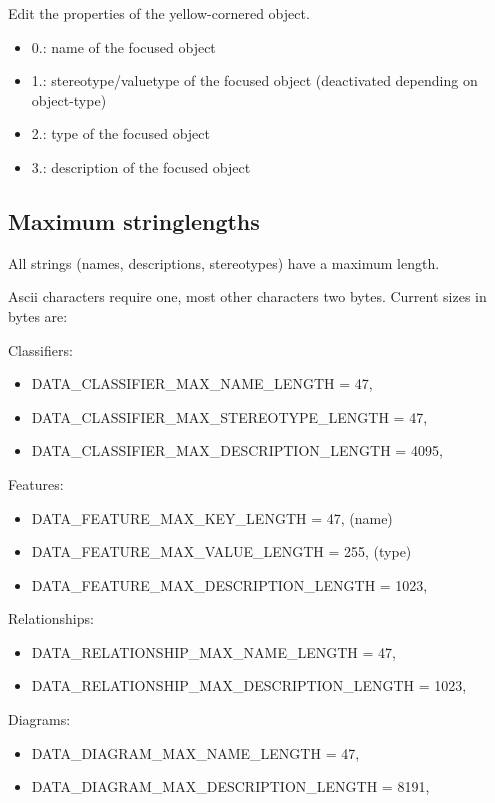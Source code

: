 Edit the properties of the yellow-cornered object.

\begin{itemize}
\item 0.: name of the focused object
\item 1.: stereotype/valuetype of the focused object (deactivated depending on object-type)
\item 2.: type of the focused object
\item 3.: description of the focused object
\end{itemize}

\subsection{Maximum stringlengths}

All strings (names, descriptions, stereotypes) have a maximum length.

Ascii characters require one, most other characters two bytes.
Current sizes in bytes are:

Classifiers:
\begin{itemize}
\item DATA\_CLASSIFIER\_MAX\_NAME\_LENGTH = 47,
\item DATA\_CLASSIFIER\_MAX\_STEREOTYPE\_LENGTH = 47,
\item DATA\_CLASSIFIER\_MAX\_DESCRIPTION\_LENGTH = 4095,
\end{itemize}

Features:
\begin{itemize}
\item DATA\_FEATURE\_MAX\_KEY\_LENGTH = 47,  (name)
\item DATA\_FEATURE\_MAX\_VALUE\_LENGTH = 255,  (type)
\item DATA\_FEATURE\_MAX\_DESCRIPTION\_LENGTH = 1023,
\end{itemize}

Relationships:
\begin{itemize}
\item DATA\_RELATIONSHIP\_MAX\_NAME\_LENGTH = 47,
\item DATA\_RELATIONSHIP\_MAX\_DESCRIPTION\_LENGTH = 1023,
\end{itemize}

Diagrams:
\begin{itemize}
\item DATA\_DIAGRAM\_MAX\_NAME\_LENGTH = 47,
\item DATA\_DIAGRAM\_MAX\_DESCRIPTION\_LENGTH = 8191,
\end{itemize}

